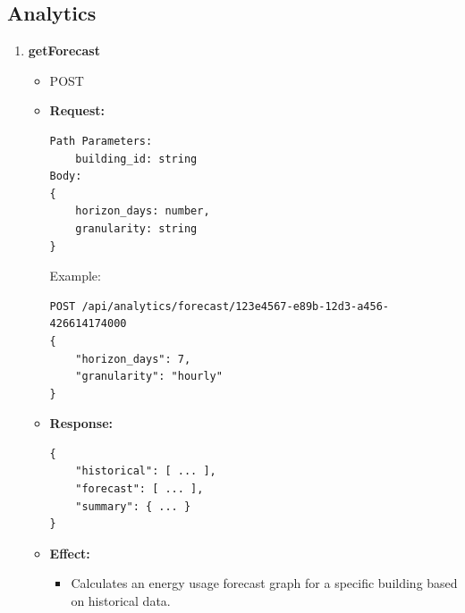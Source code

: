 \documentclass[12pt, a4paper]{article}
\begin{document}
\subsection{Analytics}
\begin{enumerate}
    \item \textbf{getForecast}
    \begin{itemize}
        \item POST 
        \item \textbf{Request:}
        \begin{verbatim}
Path Parameters:
    building_id: string
Body:
{
    horizon_days: number,
    granularity: string
}
        \end{verbatim}
        Example:
        \begin{verbatim}
POST /api/analytics/forecast/123e4567-e89b-12d3-a456-426614174000
{
    "horizon_days": 7,
    "granularity": "hourly"
}
        \end{verbatim}
        \item \textbf{Response:}
        \begin{verbatim}
{
    "historical": [ ... ],
    "forecast": [ ... ],
    "summary": { ... }
}
        \end{verbatim}
        \item \textbf{Effect:}
        \begin{itemize}
            \item Calculates an energy usage forecast graph for a specific building based on historical data.
        \end{itemize}
    \end{itemize}
\end{enumerate}
\end{document}
